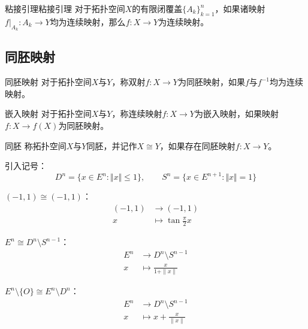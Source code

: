 \documentclass[lang = cn, scheme = chinese, thmcnt = section, usesamecnt]{elegantbook}
\begin{document}
\begin{theorem}{粘接引理}{粘接引理}
	对于拓扑空间$X$的有限闭覆盖$\{A_k\}_{k=1}^{n}$，如果诸映射$f|_{A_k}:A_k\to Y$均为连续映射，那么$f:X\to Y$为连续映射。
\end{theorem}

\subsection{同胚映射}

\begin{definition}{同胚映射}
	对于拓扑空间$X$与$Y$，称双射$f:X\to Y$为同胚映射，如果$f$与$f^{-1}$均为连续映射。
\end{definition}

\begin{definition}{嵌入映射}
	对于拓扑空间$X$与$Y$，称连续映射$f:X\to Y$为嵌入映射，如果映射$f:X\to f(X)$为同胚映射。
\end{definition}

\begin{definition}{同胚}
	称拓扑空间$X$与$Y$同胚，并记作$X\cong Y$，如果存在同胚映射$f:X\to Y$。
\end{definition}

引入记号：%
$$
D^n=\{ x\in E^n:\Vert x \Vert\le 1 \},\qquad 
S^{n}=\{ x\in E^{n+1}:\Vert x \Vert= 1 \}
$$

\begin{example}
	$(-1,1)\cong (-1,1)$：
	\begin{align*}
		(-1,1) &\longrightarrow (-1,1)\\
		x &\longmapsto \tan\frac{\pi}{2}x
	\end{align*}
\end{example}

\begin{example}
	$E^n\cong D^n\setminus S^{n-1}$：%
	\begin{align*}
		E^n &\longrightarrow D^n\setminus S^{n-1}\\
		x &\longmapsto \frac{x}{1+\|x\|}
	\end{align*}
\end{example}

\begin{example}
	$E^n\setminus\{O\}\cong E^n\setminus D^n$：%
	\begin{align*}
		E^n &\longrightarrow D^n\setminus S^{n-1}\\
		x &\longmapsto x+\frac{x}{\|x\|}
	\end{align*}
\end{example}
\end{document}
